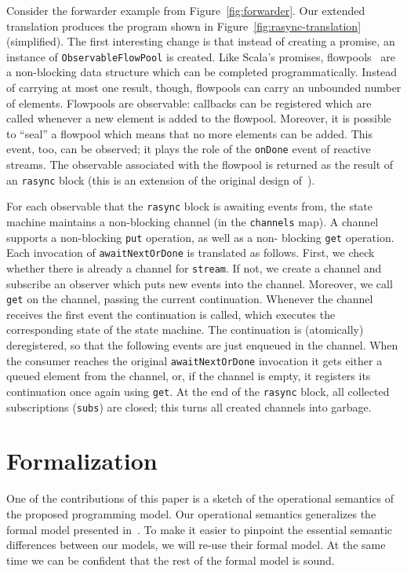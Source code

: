 \documentclass{acm_proc_article-sp}
\begin{document}
Consider the forwarder example from Figure~\ref{fig:forwarder}. Our extended
translation produces the program shown in Figure~\ref{fig:rasync-translation}
(simplified). The first interesting change is that instead of creating a
promise, an instance of \verb|ObservableFlowPool| is created. Like Scala's
promises, flowpools~\cite{ProkopecMSHO12} are a non-blocking data structure
which can be completed programmatically. Instead of carrying at most one
result, though, flowpools can carry an unbounded number of elements. Flowpools
are observable: callbacks can be registered which are called whenever a new
element is added to the flowpool. Moreover, it is possible to ``seal'' a
flowpool which means that no more elements can be added. This event, too, can
be observed; it plays the role of the \verb|onDone| event of reactive streams.
The observable associated with the flowpool is returned as the result of an
\verb|rasync| block (this is an extension of the original design
of~\cite{ProkopecMSHO12}).

For each observable that the \verb|rasync| block is awaiting events from, the
state machine maintains a non-blocking channel (in the \verb|channels| map). A
channel supports a non-blocking \verb|put| operation, as well as a non-
blocking \verb|get| operation. Each invocation of \verb|awaitNextOrDone| is
translated as follows. First, we check whether there is already a channel for
\verb|stream|. If not, we create a channel and subscribe an observer which puts
new events into the channel. Moreover, we call \verb|get| on the channel,
passing the current continuation. Whenever the channel receives the first
event the continuation is called, which executes the corresponding state of
the state machine. The continuation is (atomically) deregistered, so
that the following events are just enqueued in the channel. When the consumer
reaches the original \verb|awaitNextOrDone| invocation it gets either a queued
element from the channel, or, if the channel is empty, it registers its
continuation once again using \verb|get|. At the end of the \verb|rasync|
block, all collected subscriptions (\verb|subs|) are closed; this turns all
created channels into garbage.


\section{Formalization}

One of the contributions of this paper is a sketch of the operational semantics of the
proposed programming model. Our operational semantics generalizes the formal
model presented in~\cite{FormalizingAsync}. To make it easier to pinpoint the essential
semantic differences between our models, we will re-use their formal model.
At the same time we can be confident that the rest of the formal model is sound.
\end{document}

